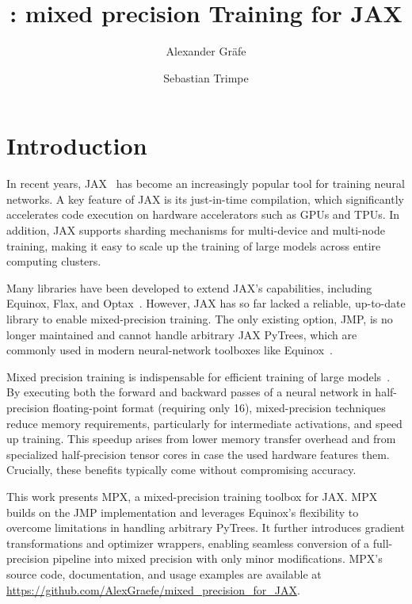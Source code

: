 \documentclass[10pt, a4paper, logo, onecolumn, internal, copyright]{dsme}
\title{\mpx{}: mixed precision Training for JAX}
\author[1]{Alexander Gräfe}
\author[1]{Sebastian Trimpe}
\affil[1]{RWTH Aachen University}
\date{}
\newcommand{\mpx}{\textsc{MPX}}
\begin{document}
\sloppy
\maketitle

\section{Introduction}

In recent years, JAX~\cite{deepmind2020jax} has become an increasingly popular tool for training neural networks. 
A key feature of JAX is its just-in-time compilation, which significantly accelerates code execution on hardware accelerators such as GPUs and TPUs. 
In addition, JAX supports sharding mechanisms for multi-device and multi-node training, making it easy to scale up the training of large models across entire computing clusters. 

Many libraries have been developed to extend JAX's capabilities, including Equinox, Flax, and Optax~\citep{kidger2021equinox,flax2020github,deepmind2020jax}. 
However, JAX has so far lacked a reliable, up-to-date library to enable mixed-precision training. The only existing option, JMP\citep{jmp}, is no longer maintained and cannot handle arbitrary JAX PyTrees, which are commonly used in modern neural-network toolboxes like Equinox~\citep{kidger2021equinox}.

Mixed precision training is indispensable for efficient training of large models~\cite{mixed_precision_paper}. 
By executing both the forward and backward passes of a neural network in half-precision floating-point format (requiring only \qty{16}{\bit}), mixed-precision techniques reduce memory requirements, particularly for intermediate activations, and speed up training. 
This speedup arises from lower memory transfer overhead and from specialized half-precision tensor cores in case the used hardware features them. 
Crucially, these benefits typically come without compromising accuracy.

This work presents \mpx{}, a mixed-precision training toolbox for JAX. 
\mpx{} builds on the JMP implementation and leverages Equinox's flexibility to overcome limitations in handling arbitrary PyTrees. It further introduces gradient transformations and optimizer wrappers, enabling seamless conversion of a full-precision pipeline into mixed precision with only minor modifications. \mpx{}'s source code, documentation, and usage examples are available at \url{https://github.com/AlexGraefe/mixed_precision_for_JAX}.
\end{document}
